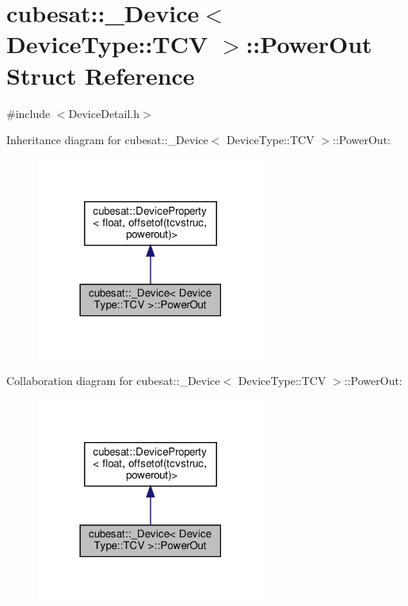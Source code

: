 \hypertarget{structcubesat_1_1__Device_3_01DeviceType_1_1TCV_01_4_1_1PowerOut}{}\section{cubesat\+:\+:\+\_\+\+Device$<$ Device\+Type\+:\+:T\+CV $>$\+:\+:Power\+Out Struct Reference}
\label{structcubesat_1_1__Device_3_01DeviceType_1_1TCV_01_4_1_1PowerOut}


{\ttfamily \#include $<$Device\+Detail.\+h$>$}



Inheritance diagram for cubesat\+:\+:\+\_\+\+Device$<$ Device\+Type\+:\+:T\+CV $>$\+:\+:Power\+Out\+:\nopagebreak
\begin{figure}[H]
\begin{center}
\leavevmode
\includegraphics[width=213pt]{structcubesat_1_1__Device_3_01DeviceType_1_1TCV_01_4_1_1PowerOut__inherit__graph}
\end{center}
\end{figure}


Collaboration diagram for cubesat\+:\+:\+\_\+\+Device$<$ Device\+Type\+:\+:T\+CV $>$\+:\+:Power\+Out\+:\nopagebreak
\begin{figure}[H]
\begin{center}
\leavevmode
\includegraphics[width=213pt]{structcubesat_1_1__Device_3_01DeviceType_1_1TCV_01_4_1_1PowerOut__coll__graph}
\end{center}
\end{figure}
